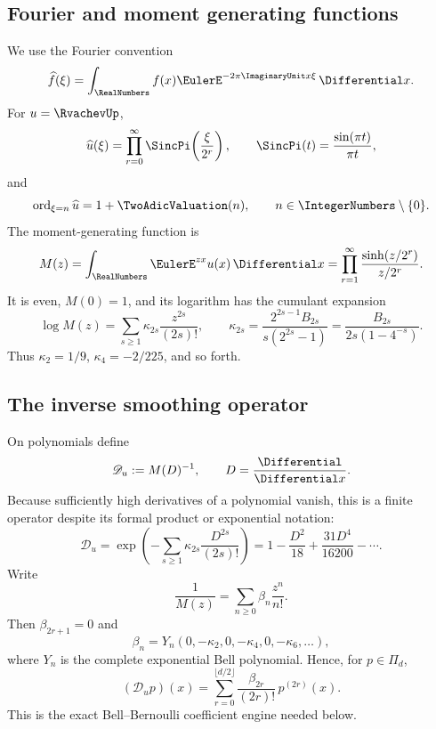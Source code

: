\documentclass[11pt,oneside]{article}
\numberwithin{equation}{section}
\theoremstyle{definition}
\theoremstyle{remark}
\newcommand{\calD}{\mathscr D_u}
\begin{document}
\subsection{Fourier and moment generating functions}
We use the Fourier convention
\begin{equation}
 \widehat f(\xi)=\int_{\RealNumbers}f(x)\EulerE^{-2\pi\ImaginaryUnit x\xi}\,\Differential x.
 \label{eq:fourier}
\end{equation}
For \(u=\RvachevUp\),
\begin{equation}
 \widehat u(\xi)=\prod_{r=0}^{\infty}
 \SincPi\!\left(\frac{\xi}{2^r}\right),
 \qquad
 \SincPi(t)=\frac{\sin(\pi t)}{\pi t},
 \label{eq:sinc-prod}
\end{equation}
and
\begin{equation}
 \operatorname{ord}_{\xi=n}\widehat u=1+\TwoAdicValuation(n),\qquad n\in\IntegerNumbers\setminus\{0\}.
 \label{eq:zero-order}
\end{equation}
The moment-generating function is
\begin{equation}
 M(z)=\int_{\RealNumbers}\EulerE^{zx}u(x)\,\Differential x
 =\prod_{r=1}^{\infty}\frac{\sinh(z/2^r)}{z/2^r}.
 \label{eq:mgf}
\end{equation}
It is even, \(M(0)=1\), and its logarithm has the cumulant expansion
\begin{equation}
 \log M(z)=\sum_{s\ge1}\kappa_{2s}\frac{z^{2s}}{(2s)!},
 \qquad
 \kappa_{2s}=\frac{2^{2s-1}B_{2s}}{s(2^{2s}-1)}
 =\frac{B_{2s}}{2s(1-4^{-s})}.
 \label{eq:cumulants}
\end{equation}
Thus \(\kappa_2=1/9\), \(\kappa_4=-2/225\), and so forth.

\subsection{The inverse smoothing operator}
On polynomials define
\begin{equation}
 \calD:=M(D)^{-1},\qquad D=\frac{\Differential}{\Differential x}.
 \label{eq:deconv-def}
\end{equation}
Because sufficiently high derivatives of a polynomial vanish, this is a finite
operator despite its formal product or exponential notation:
\begin{equation}
 \calD
 =\exp\!\left(-\sum_{s\ge1}\kappa_{2s}
                   \frac{D^{2s}}{(2s)!}\right)
 =1-\frac{D^2}{18}+\frac{31D^4}{16200}-\cdots.
 \label{eq:deconv-exp}
\end{equation}
Write
\begin{equation}
 \frac1{M(z)}=\sum_{n\ge0}\beta_n\frac{z^n}{n!}.
 \label{eq:beta}
\end{equation}
Then \(\beta_{2r+1}=0\) and
\begin{equation}
 \beta_n=Y_n(0,-\kappa_2,0,-\kappa_4,0,-\kappa_6,\ldots),
 \label{eq:bell-beta}
\end{equation}
where \(Y_n\) is the complete exponential Bell polynomial.  Hence, for
\(p\in\Pi_d\),
\begin{equation}
 (\calD p)(x)=\sum_{r=0}^{\lfloor d/2\rfloor}
 \frac{\beta_{2r}}{(2r)!}\,p^{(2r)}(x).
 \label{eq:deconv-deriv}
\end{equation}
This is the exact Bell--Bernoulli coefficient engine needed below.
\end{document}

